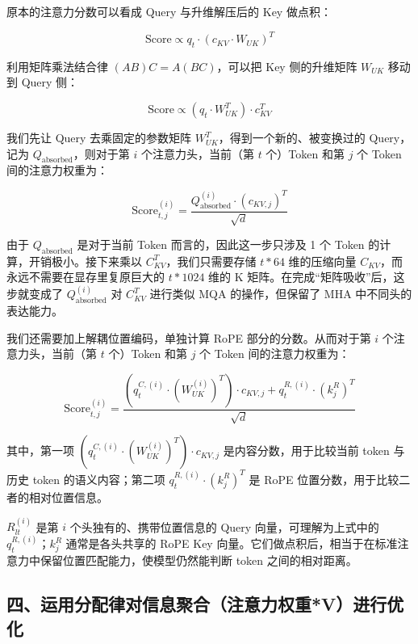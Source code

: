 原本的注意力分数可以看成 Query 与升维解压后的 Key 做点积：

\[
\mathrm{Score} \propto q_t \cdot (c_{KV} \cdot W_{UK})^T
\]

利用矩阵乘法结合律 \((AB)C=A(BC)\)，可以把 Key 侧的升维矩阵 \(W_{UK}\) 移动到 Query 侧：

\[
\mathrm{Score} \propto (q_t \cdot W_{UK}^T) \cdot c_{KV}^T
\]

我们先让 Query 去乘固定的参数矩阵 \(W_{UK}^T\)，得到一个新的、被变换过的 Query，记为 \(Q_{\mathrm{absorbed}}\)，则对于第 \(i\) 个注意力头，当前（第 \(t\) 个）Token 和第 \(j\) 个 Token 间的注意力权重为：

\[
\mathrm{Score}_{t,j}^{(i)}
=
\frac{Q_{\mathrm{absorbed}}^{(i)} \cdot (c_{KV,j})^T}{\sqrt{d}}
\]

由于 \(Q_{\mathrm{absorbed}}\) 是对于当前 Token 而言的，因此这一步只涉及 1 个 Token 的计算，开销极小。接下来乘以 \(C_{KV}^T\)，我们只需要存储 \(t*64\) 维的压缩向量 \(C_{KV}\)，而永远不需要在显存里复原巨大的 \(t*1024\) 维的 K 矩阵。在完成``矩阵吸收''后，这步就变成了 \(Q_{\mathrm{absorbed}}^{(i)}\) 对 \(C_{KV}^T\) 进行类似 MQA 的操作，但保留了 MHA 中不同头的表达能力。

我们还需要加上解耦位置编码，单独计算 RoPE 部分的分数。从而对于第 \(i\) 个注意力头，当前（第 \(t\) 个）Token 和第 \(j\) 个 Token 间的注意力权重为：

\[
\mathrm{Score}_{t,j}^{(i)}
=
\frac{
\left(q_t^{C,(i)} \cdot (W_{UK}^{(i)})^T\right) \cdot c_{KV,j}
+
q_t^{R,(i)} \cdot (k_j^R)^T
}{\sqrt{d}}
\]

其中，第一项 \(\left(q_t^{C,(i)} \cdot (W_{UK}^{(i)})^T\right) \cdot c_{KV,j}\) 是内容分数，用于比较当前 token 与历史 token 的语义内容；第二项 \(q_t^{R,(i)} \cdot (k_j^R)^T\) 是 RoPE 位置分数，用于比较二者的相对位置信息。

\(R_{lt}^{(i)}\) 是第 \(i\) 个头独有的、携带位置信息的 Query 向量，可理解为上式中的 \(q_t^{R,(i)}\)；\(k_j^R\) 通常是各头共享的 RoPE Key 向量。它们做点积后，相当于在标准注意力中保留位置匹配能力，使模型仍然能判断 token 之间的相对距离。

\hypertarget{ux56dbux8fd0ux7528ux5206ux914dux5f8bux5bf9ux4fe1ux606fux805aux5408ux6ce8ux610fux529bux6743ux91cdvux8fdbux884cux4f18ux5316}{%
\subsection{四、运用分配律对信息聚合（注意力权重*V）进行优化}\label{ux56dbux8fd0ux7528ux5206ux914dux5f8bux5bf9ux4fe1ux606fux805aux5408ux6ce8ux610fux529bux6743ux91cdvux8fdbux884cux4f18ux5316}}

